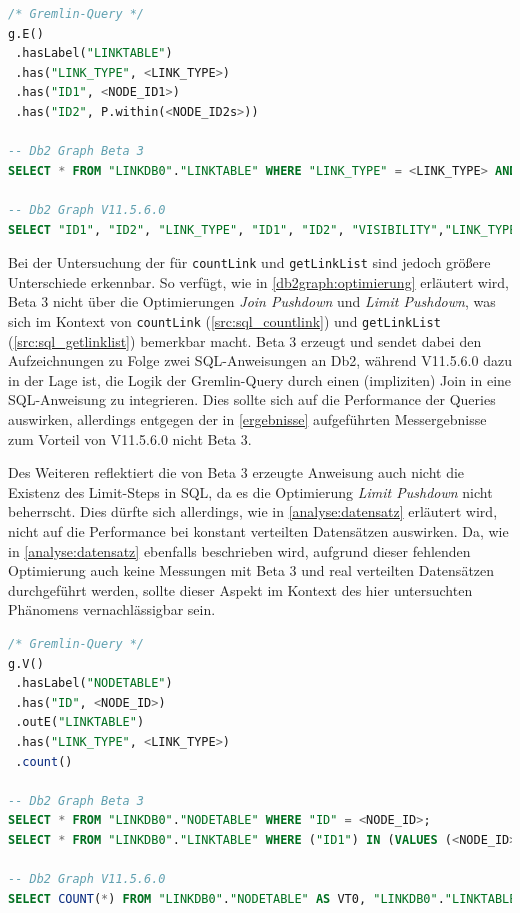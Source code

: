 \begin{lstlisting}[caption={Generierter SQL-Code getLink},label=src:sql_getlink,language=SQL]
/* Gremlin-Query */
g.E()
 .hasLabel("LINKTABLE")
 .has("LINK_TYPE", <LINK_TYPE>)
 .has("ID1", <NODE_ID1>)
 .has("ID2", P.within(<NODE_ID2s>))

-- Db2 Graph Beta 3
SELECT * FROM "LINKDB0"."LINKTABLE" WHERE "LINK_TYPE" = <LINK_TYPE> AND "ID1" = <NODE_ID1> AND "ID2" IN (VALUES <NODE_ID2_0>, <NODE_ID2_1>, <...>);

-- Db2 Graph V11.5.6.0
SELECT "ID1", "ID2", "LINK_TYPE", "ID1", "ID2", "VISIBILITY","LINK_TYPE", "DATA", "ID2", "ID1", "VERSION", "TIME" FROM "LINKDB0"."LINKTABLE" WHERE "LINK_TYPE" = <LINK_TYPE> AND "ID1" = <NODE_ID1> AND "ID2" IN (VALUES <NODE_ID2_0>, <NODE_ID2_1>, <...>);
\end{lstlisting}

Bei der Untersuchung der für \texttt{countLink} und \texttt{getLinkList} sind jedoch größere Unterschiede erkennbar. So verfügt, wie in \autoref{db2graph:optimierung} erläutert wird, Beta 3 nicht über die Optimierungen \textit{Join Pushdown} und \textit{Limit Pushdown}, was sich im Kontext von \texttt{countLink} (\autoref{src:sql_countlink}) und \texttt{getLinkList} (\autoref{src:sql_getlinklist}) bemerkbar macht. Beta 3 erzeugt und sendet dabei den Aufzeichnungen zu Folge zwei SQL-Anweisungen an Db2, während V11.5.6.0 dazu in der Lage ist, die Logik der Gremlin-Query durch einen (impliziten) Join in eine SQL-Anweisung zu integrieren. Dies sollte sich auf die Performance der Queries auswirken, allerdings entgegen der in \autoref{ergebnisse} aufgeführten Messergebnisse zum Vorteil von V11.5.6.0 nicht Beta 3. 

Des Weiteren reflektiert die von Beta 3 erzeugte Anweisung auch nicht die Existenz des Limit-Steps in SQL, da es die Optimierung \textit{Limit Pushdown} nicht beherrscht. Dies dürfte sich allerdings, wie in \autoref{analyse:datensatz} erläutert wird, nicht auf die Performance bei konstant verteilten Datensätzen auswirken. Da, wie in \autoref{analyse:datensatz} ebenfalls beschrieben wird, aufgrund dieser fehlenden Optimierung auch keine Messungen mit Beta 3 und real verteilten Datensätzen durchgeführt werden, sollte dieser Aspekt im Kontext des hier untersuchten Phänomens vernachlässigbar sein. 
\begin{lstlisting}[caption={Generierter SQL-Code countLink},label=src:sql_countlink,language=SQL]
/* Gremlin-Query */
g.V()
 .hasLabel("NODETABLE")
 .has("ID", <NODE_ID>)
 .outE("LINKTABLE")
 .has("LINK_TYPE", <LINK_TYPE>)
 .count()

-- Db2 Graph Beta 3
SELECT * FROM "LINKDB0"."NODETABLE" WHERE "ID" = <NODE_ID>;
SELECT * FROM "LINKDB0"."LINKTABLE" WHERE ("ID1") IN (VALUES (<NODE_ID>)) AND "LINK_TYPE" = <LINK_TYPE>;

-- Db2 Graph V11.5.6.0
SELECT COUNT(*) FROM "LINKDB0"."NODETABLE" AS VT0, "LINKDB0"."LINKTABLE" AS ET1 WHERE VT0."ID" = <NODE_ID> AND ET1."LINK_TYPE" = <LINK_TYPE> AND VT0.ID = ET1.ID1
\end{lstlisting}

